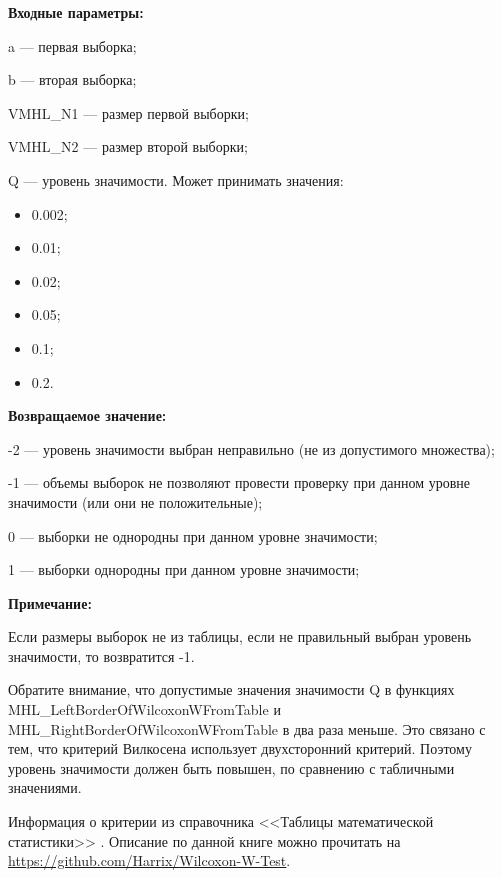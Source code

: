 \textbf{Входные параметры:}

 a --- первая выборка;
 
b --- вторая выборка;
 
VMHL\_N1 --- размер первой выборки;
 
VMHL\_N2 --- размер второй выборки;
 
Q --- уровень значимости. Может принимать значения:
	
\begin{itemize}
\item 0.002;
\item 0.01; 
\item 0.02; 
\item 0.05; 
\item 0.1; 
\item 0.2.
\end{itemize}

\textbf{Возвращаемое значение:}

 -2 --- уровень значимости выбран неправильно (не из допустимого множества);
 
 -1 --- объемы выборок не позволяют провести проверку при данном уровне значимости (или они не положительные);
 
 0 --- выборки не однородны  при данном уровне значимости;
 
 1 --- выборки однородны  при данном уровне значимости;

\textbf{Примечание:}

 Если размеры выборок не из таблицы, если не правильный выбран уровень значимости, то возвратится -1.
 
 Обратите внимание, что допустимые значения значимости Q в функциях MHL\_LeftBorderOfWilcoxonWFromTable и MHL\_RightBorderOfWilcoxonWFromTable в два раза меньше. Это связано с тем, что критерий Вилкосена использует двухсторонний критерий. Поэтому уровень значимости должен быть повышен, по сравнению с табличными значениями.
	 
 Информация о критерии из  справочника <<Таблицы математической статистики>> \cite[с. 93]{book:Bolshev1983}. Описание по данной книге можно прочитать на \href {https://github.com/Harrix/Wilcoxon-W-Test} {https://github.com/Harrix/Wilcoxon-W-Test}.
